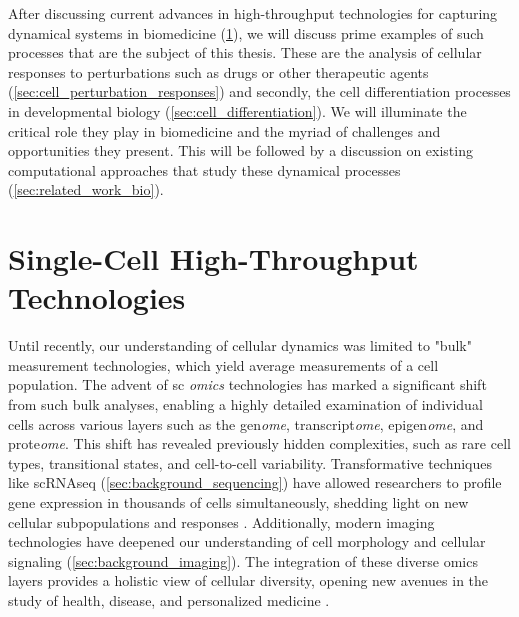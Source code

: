 After discussing current advances in high-throughput technologies for capturing dynamical systems in biomedicine (\cref{sec:tech_background}), we will discuss prime examples of such processes that are the subject of this thesis. 
These are the analysis of cellular responses to perturbations such as drugs or other therapeutic agents (\cref{sec:cell_perturbation_responses}) and secondly, the cell differentiation processes in developmental biology (\cref{sec:cell_differentiation}). We will illuminate the critical role they play in biomedicine and the myriad of challenges and opportunities they present. 
This will be followed by a discussion on existing computational approaches that study these dynamical processes (\cref{sec:related_work_bio}).


\section{Single-Cell High-Throughput Technologies}
\label{sec:tech_background}

Until recently, our understanding of cellular dynamics was limited to "bulk" measurement technologies, which yield average measurements of a cell population.
The advent of \acrlong{sc} \textit{omics} technologies has marked a significant shift from such bulk analyses, enabling a highly detailed examination of individual cells across various layers such as the gen\textit{ome}, transcript\textit{ome}, epigen\textit{ome}, and prote\textit{ome}.
This shift has revealed previously hidden complexities, such as rare cell types, transitional states, and cell-to-cell variability. Transformative techniques like \acrshort{sc}\acrshort{RNAseq} (\cref{sec:background_sequencing}) have allowed researchers to profile gene expression in thousands of cells simultaneously, shedding light on new cellular subpopulations and responses \citep{jia2022high}.
Additionally, modern imaging technologies have deepened our understanding of cell morphology and cellular signaling (\cref{sec:background_imaging}). 
The integration of these diverse omics layers provides a holistic view of cellular diversity, opening new avenues in the study of health, disease, and personalized medicine \citep{baysoy2023technological}.

